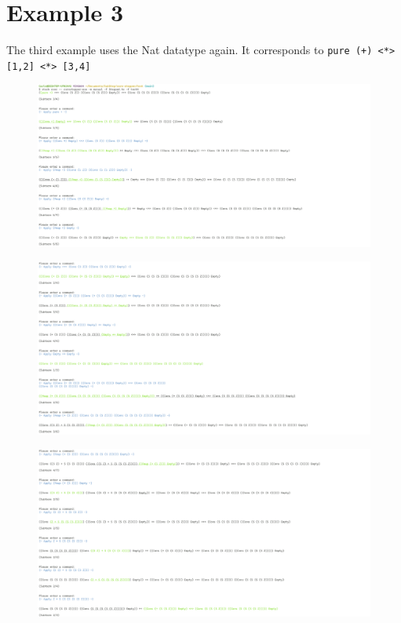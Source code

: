 \clearpage
\section{Example 3}
The third example uses the Nat datatype again.
It corresponds to \texttt{pure (+) <*> [1,2] <*> [3,4]}

\begin{figure}
    \includegraphics[width=1\textwidth]{resources/applicative_part_1.PNG}
\end{figure}
\begin{figure}
    \includegraphics[width=1\textwidth]{resources/applicative_part_2.PNG}
\end{figure}
\begin{figure}
    \includegraphics[width=1\textwidth]{resources/applicative_part_3.PNG}
\end{figure}
